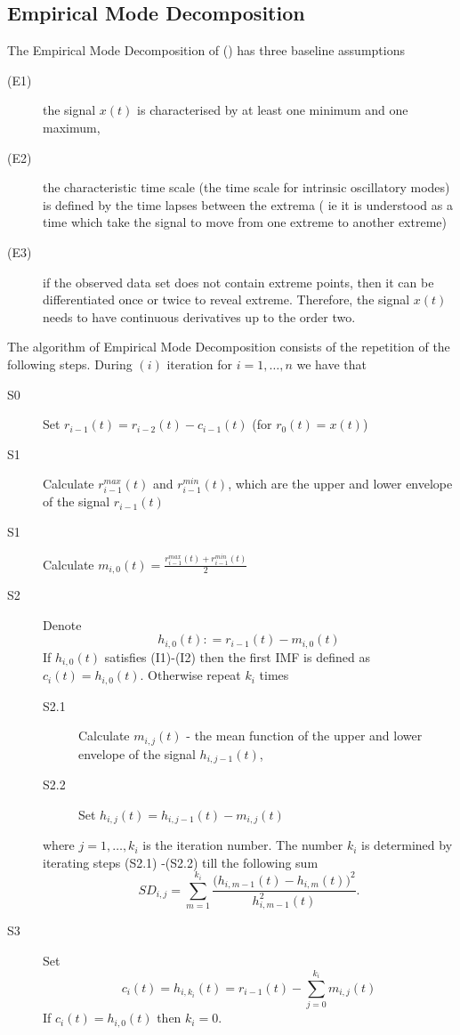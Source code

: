\documentclass[article,moreauthors,pdftex,10pt,a4paper]{ssrn}
\begin{document}
\subsection{Empirical Mode Decomposition}
The Empirical Mode Decomposition of () has three baseline assumptions
\begin{description}
\item[(E1)] the signal $x(t)$ is characterised by at least one minimum and one maximum, 
\item[(E2)] the characteristic time scale (the time scale for intrinsic oscillatory modes) is defined by the time lapses between the extrema ( ie it is understood as a time which take the signal to move from one extreme to another extreme) 
\item[(E3)] if the observed data set does not contain extreme points, then it can be differentiated once or twice to reveal extreme. Therefore, the signal $x(t)$ needs to have continuous derivatives up to the order two.
\end{description}
The algorithm of Empirical Mode Decomposition consists of the repetition of the following steps. During $(i)$ iteration for $i = 1,\ldots, n$ we have that
\begin{description}
\item[S0] Set $r_{i-1}(t) = r_{i-2}(t) - c_{i-1}(t)$ (for $r_0(t) = x(t)$)
\item[S1] Calculate  $r_{i-1}^{max}(t) $ and $r_{i-1}^{min}(t)$, which are the upper and lower envelope of the signal $r_{i-1}(t)$ 
\item[S1] Calculate $m_{i,0}(t) = \frac{r_{i-1}^{max}(t) +r_{i-1}^{min}(t)}{2}$ 
\item[S2] Denote
$$
h_{i,0}(t): = r_{i-1}(t) - m_{i,0}(t)
$$
If $h_{i,0}(t)$ satisfies (I1)-(I2) then the first IMF is defined as $c_i(t) = h_{i,0}(t)$. Otherwise repeat $k_i$ times 
\begin{description}
\item[S2.1] Calculate $m_{i,j}(t)$ - the mean function of the upper and lower envelope of the signal $h_{i,j-1}(t)$,
\item[S2.2] Set $h_{i,j}(t) = h_{i,j-1}(t) - m_{i,j}(t)$
\end{description}
where $j = 1, \ldots,k_i$ is the iteration number. The number $k_i$ is determined by iterating steps (S2.1) -(S2.2) till the following sum
\begin{equation}
SD_{i,j} = \sum_{m = 1}^{k_i } \frac{\big( h_{i,m-1}(t) - h_{i,m}(t)  \big)^2}{h_{i,m-1}^2(t) }.
\end{equation}
\item[S3] Set 
\begin{equation}\label{eq:IMFs_mean_functions}
c_i(t) = h_{i,k_i}(t) = r_{i-1}(t)  - \sum_{j = 0}^{k_i}  m_{i,j}(t)
\end{equation}
If $c_i(t) = h_{i,0}(t)$ then $k_i =0$.
\end{description}
\end{document}
